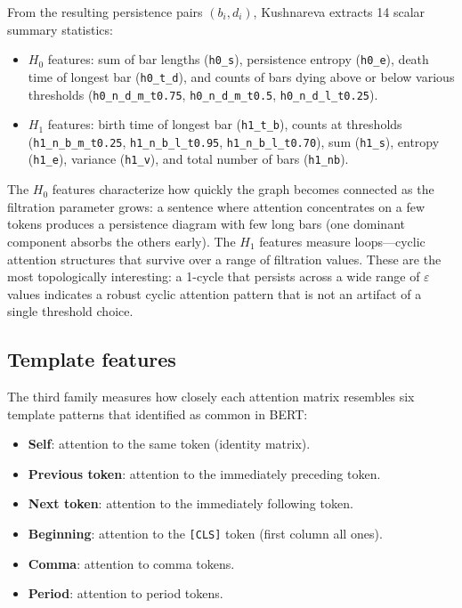 From the resulting persistence pairs $(b_i, d_i)$, Kushnareva extracts 14 scalar summary statistics:

\begin{itemize}
  \item $H_0$ features: sum of bar lengths (\texttt{h0\_s}), persistence entropy (\texttt{h0\_e}), death time of longest bar (\texttt{h0\_t\_d}), and counts of bars dying above or below various thresholds (\texttt{h0\_n\_d\_m\_t0.75}, \texttt{h0\_n\_d\_m\_t0.5}, \texttt{h0\_n\_d\_l\_t0.25}).
  \item $H_1$ features: birth time of longest bar (\texttt{h1\_t\_b}), counts at thresholds (\texttt{h1\_n\_b\_m\_t0.25}, \texttt{h1\_n\_b\_l\_t0.95}, \texttt{h1\_n\_b\_l\_t0.70}), sum (\texttt{h1\_s}), entropy (\texttt{h1\_e}), variance (\texttt{h1\_v}), and total number of bars (\texttt{h1\_nb}).
\end{itemize}

The $H_0$ features characterize how quickly the graph becomes connected as the filtration parameter grows: a sentence where attention concentrates on a few tokens produces a persistence diagram with few long bars (one dominant component absorbs the others early). The $H_1$ features measure loops---cyclic attention structures that survive over a range of filtration values. These are the most topologically interesting: a 1-cycle that persists across a wide range of $\varepsilon$ values indicates a robust cyclic attention pattern that is not an artifact of a single threshold choice.

\subsection{Template features}

The third family measures how closely each attention matrix resembles six template patterns that \textcite{clark2019} identified as common in BERT:

\begin{itemize}
  \item \textbf{Self}: attention to the same token (identity matrix).
  \item \textbf{Previous token}: attention to the immediately preceding token.
  \item \textbf{Next token}: attention to the immediately following token.
  \item \textbf{Beginning}: attention to the \texttt{[CLS]} token (first column all ones).
  \item \textbf{Comma}: attention to comma tokens.
  \item \textbf{Period}: attention to period tokens.
\end{itemize}

